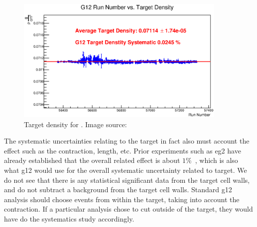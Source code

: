 \begin{figure}[htpb]\begin{center}
\includegraphics[width=0.9\textwidth]{figures/calib/targ/G12_Target_Density.eps}
\caption[Target density for ]{\label{fig:target_density}Target density for . Image source:~\cite{clas.thesis.kunkel}}
\end{center}\end{figure}
\FloatBarrier

The systematic uncertainties relating to the target in fact also must account the effect such as the contraction, length, etc. Prior experiments such as eg2 have already established that the overall related effect is about $1\%$~\cite{eg2target}, which is also what g12 would use for the overall systematic uncertainty related to target. We do 	not see that there is any statistical significant data from the target cell walls, 	and do not subtract a background from the target cell walls. Standard g12 analysis 	should choose events from within the target, taking into account the contraction. 	If a particular 	analysis  chose to cut outside of the target, they would have do the 	systematics study accordingly. 